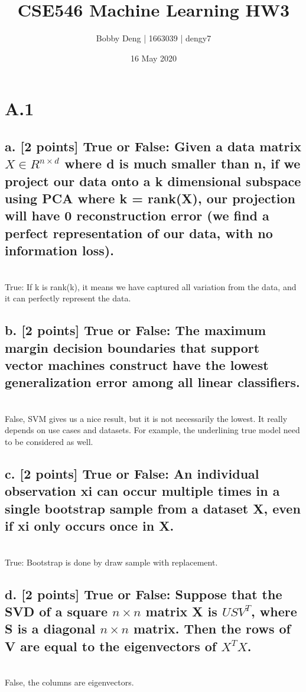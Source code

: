 \documentclass{article}
\title{CSE546 Machine Learning HW3}
\author{Bobby Deng | 1663039 | dengy7 }
\date{16 May 2020}
\begin{document}
\maketitle


\section*{A.1}
\subsection*{a. [2 points] True or False: Given a data matrix $X \in R^{n \times d }$ where d is much smaller than n, if we project our data onto a k dimensional subspace using PCA where k = rank(X), our projection will have 0 reconstruction error (we find a perfect representation of our data, with no information loss).}

 \\
True: If k is rank(k), it means we have captured all variation from the data, and it can perfectly represent the data.

\subsection*{b. [2 points] True or False: The maximum margin decision boundaries that support vector machines construct have the lowest generalization error among all linear classifiers.}
 \\
False, SVM gives us a nice result, but it is not necessarily the lowest. It really depends on use cases and datasets. For example, the underlining true model need to be considered as well.

\subsection*{c. [2 points] True or False: An individual observation xi can occur multiple times in a single bootstrap sample from a dataset X, even if xi only occurs once in X.}
 \\
True: Bootstrap is done by draw sample with replacement.

\subsection*{d. [2 points] True or False: Suppose that the SVD of a square $n \times n$ matrix X is $USV^T$, where S is a diagonal $n \times n$ matrix. Then the rows of V are equal to the eigenvectors of $X^TX$.}
 \\
False, the columns are eigenvectors.
\end{document}
